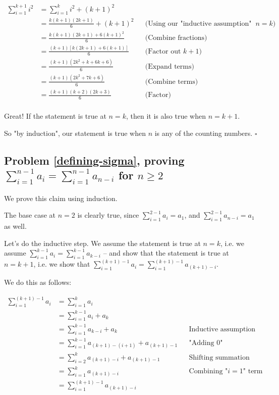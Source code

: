 \begin{align*}
\sum_{i=1}^{k+1} i^2 &= \sum_{i=1}^{k} i^2 + (k+1)^2 \\
&= \frac{k(k+1)(2k+1)}{6} + (k+1)^2 && \text{(Using our "inductive assumption" that the statement is true at $n = k$)} \\
&= \frac{k(k+1)(2k+1) + 6(k+1)^2}{6} && \text{(Combine fractions)} \\
&= \frac{(k+1)\left[k(2k+1) + 6(k+1)\right]}{6} && \text{(Factor out $k+1$)} \\
&= \frac{(k+1)(2k^2 + k + 6k + 6)}{6} && \text{(Expand terms)} \\
&= \frac{(k+1)(2k^2 + 7k + 6)}{6} && \text{(Combine terms)} \\
&= \frac{(k+1)(k+2)(2k+3)}{6} && \text{(Factor)} \\
\end{align*}

Great! If the statement is true at $n = k$, then it is also true when $n = k + 1$. 

So "by induction", our statement is true when $n$ is any of the counting numbers. $\square$



\subsection{Problem \ref{defining-sigma}, proving $\sum_{i=1}^{n-1} a_i = \sum_{i=1}^{n-1} a_{n-i}$ for $n \geq 2$}

We prove this claim using induction. 

The base case at $n = 2$ is clearly true, since $\sum_{i=1}^{2-1} a_i = a_1$, and $\sum_{i=1}^{2-1} a_{n-i} = a_1$ as well. 

Let's do the inductive step. We assume the statement is true at $n = k$, i.e. we assume $\sum_{i=1}^{k-1} a_i = \sum_{i=1}^{k-1} a_{k-i}$ -- and show that the statement is true at $n = k + 1$, i.e. we show that $\sum_{i=1}^{(k+1)-1} a_i = \sum_{i=1}^{(k+1)-1} a_{(k+1)-i}$.

We do this as follows:

\begin{align*}
\sum_{i=1}^{(k+1)-1} a_i &= \sum_{i=1}^{k} a_i \\
&= \sum_{i=1}^{k-1} a_i + a_k \\
&= \sum_{i=1}^{k-1} a_{k-i} + a_k && \text{Inductive assumption} \\
&= \sum_{i=1}^{k-1} a_{(k+1)-(i+1)} + a_{(k+1)-1} && \text{"Adding 0"} \\
&= \sum_{i=2}^{k} a_{(k+1)-i} + a_{(k+1)-1} && \text{Shifting summation index} \\
&= \sum_{i=1}^{k} a_{(k+1)-i} && \text{Combining "$i = 1$" term} \\
&= \sum_{i=1}^{(k+1)-1} a_{(k+1)-i} \\
\end{align*}

